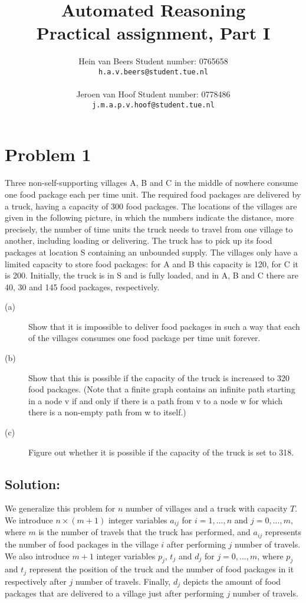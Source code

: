 \documentclass[a4paper]{article}
\author{Hein van Beers \qquad Student number: 0765658 \\{\tt h.a.v.beers@student.tue.nl}\\ \\ Jeroen van Hoof \qquad Student number: 0778486 \\{\tt j.m.a.p.v.hoof@student.tue.nl}}
\title{Automated Reasoning\\
	 \large Practical assignment, Part I}
\begin{document}
	\maketitle
	
	\section*{Problem 1}

Three non-self-supporting villages A, B and C in the middle of nowhere consume one food package each per time unit. The required food packages are delivered by a truck, having a capacity of 300 food packages. The locations of the villages are given in the following picture, in which the numbers indicate the distance, more precisely, the number of time units the truck needs to travel from one village to another, including loading or delivering. The truck has to pick up its food packages at location S containing an unbounded supply. The villages only have a limited capacity to store food packages: for A and B this capacity is 120, for C it is 200. Initially, the truck is in S and is fully loaded, and in A, B and C there are 40, 30 and 145 food packages, respectively.


\begin{description}
  \item[(a)] Show that it is impossible to deliver food packages in such a way that each of the villages consumes one food package per time unit forever.
  \item[(b)]  Show that this is possible if the capacity of the truck is increased to 320 food packages. (Note that a finite graph contains an infinite path starting in a node v if and only if there is a path from v to a node w for which there is a non-empty path from w to itself.)
  \item[(c)]  Figure out whether it is possible if the capacity of the truck is set to 318.
\end{description}

\subsection*{Solution:}

We generalize this problem for $n$ number of villages and a truck with capacity $T$. We introduce $n\times (m+1)$ integer variables $a_{ij}$ for $i=1,...,n$ and $j=0,...,m$, where $m$ is the number of travels that the truck has performed, and $a_{ij}$ represents the number of food packages in the village $i$ after performing $j$ number of travels. We also introduce $m+1$ integer variables $p_j$, $t_j$ and $d_j$ for $j=0,...,m$, where $p_j$ and $t_j$ represent the position of the truck and the number of food packages in it respectively after $j$ number of travels. Finally, $d_j$ depicts the amount of food packages that are delivered to a village just after performing $j$ number of travels.
\end{document}

